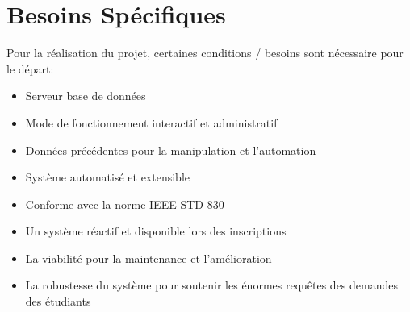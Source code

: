 \chapter{Besoins Spécifiques}
Pour la réalisation du projet, certaines conditions / besoins sont nécessaire pour le départ:
\begin{itemize}
    \item Serveur base de données
    \item Mode de fonctionnement interactif et administratif
    \item Données précédentes pour la manipulation et l'automation
    \item Système automatisé et extensible
    \item Conforme avec la norme IEEE STD 830
    \item Un système réactif et disponible lors des inscriptions
    \item La viabilité pour la maintenance et l'amélioration
        \item La robustesse du système pour soutenir les énormes requêtes des demandes des étudiants
\end{itemize}
